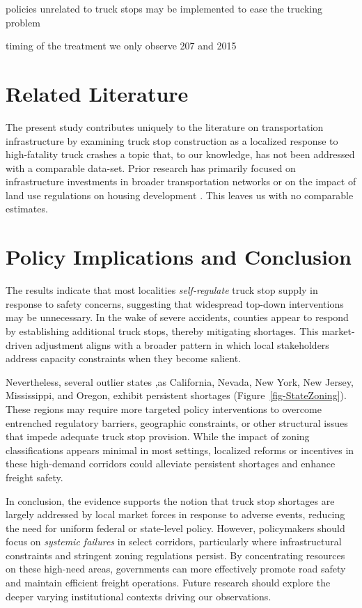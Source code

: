 \documentclass[
  8pt,
  12pt]{article}
\begin{document}
policies unrelated to truck stops may be implemented to ease the
trucking problem

timing of the treatment we only observe 207 and 2015

\section{Related Literature}\label{related-literature}

The present study contributes uniquely to the literature on
transportation infrastructure by examining truck stop construction as a
localized response to high-fatality truck crashes a topic that, to our
knowledge, has not been addressed with a comparable data-set. Prior
research has primarily focused on infrastructure investments in broader
transportation networks or on the impact of land use regulations on
housing development \citet{mclaughlinLandUseRegulation2012} . This
leaves us with no comparable estimates.

\section{\texorpdfstring{\textbf{Policy Implications and
Conclusion}}{Policy Implications and Conclusion}}\label{policy-implications-and-conclusion}

The results indicate that most localities \emph{self-regulate} truck
stop supply in response to safety concerns, suggesting that widespread
top-down interventions may be unnecessary. In the wake of severe
accidents, counties appear to respond by establishing additional truck
stops, thereby mitigating shortages. This market-driven adjustment
aligns with a broader pattern in which local stakeholders address
capacity constraints when they become salient.

Nevertheless, several outlier states ,as California, Nevada, New York,
New Jersey, Mississippi, and Oregon, exhibit persistent shortages
(Figure~\ref{fig-StateZoning}). These regions may require more targeted
policy interventions to overcome entrenched regulatory barriers,
geographic constraints, or other structural issues that impede adequate
truck stop provision. While the impact of zoning classifications appears
minimal in most settings, localized reforms or incentives in these
high-demand corridors could alleviate persistent shortages and enhance
freight safety.

In conclusion, the evidence supports the notion that truck stop
shortages are largely addressed by local market forces in response to
adverse events, reducing the need for uniform federal or state-level
policy. However, policymakers should focus on \emph{systemic failures}
in select corridors, particularly where infrastructural constraints and
stringent zoning regulations persist. By concentrating resources on
these high-need areas, governments can more effectively promote road
safety and maintain efficient freight operations. Future research should
explore the deeper varying institutional contexts driving our
observations.


  
\end{document}
